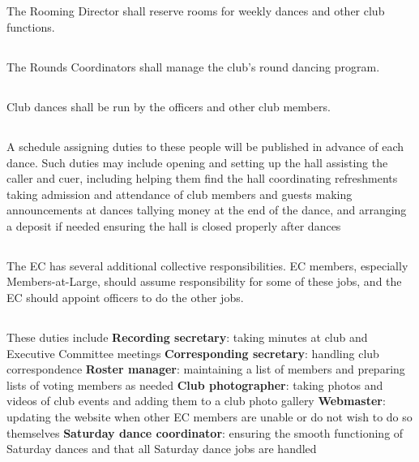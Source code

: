 \documentclass{bylaws}
\begin{document}
\subsection{}The Rooming Director shall reserve rooms for weekly dances and other club functions.
\subsection{}The Rounds Coordinators shall manage the club's round dancing program.

\subsection{}Club dances shall be run by the officers and other club members.

\subsection{}A schedule assigning duties to these people will be published in advance of each dance. Such duties may include
\duty opening and setting up the hall
\duty assisting the caller and cuer, including helping them find the hall
\duty coordinating refreshments
\duty taking admission and attendance of club members and guests
\duty making announcements at dances
\duty tallying money at the end of the dance, and arranging a deposit if needed
\duty ensuring the hall is closed properly after dances

\subsection{}The EC has several additional collective responsibilities. EC members, especially Members-at-Large, should assume responsibility for some of these jobs, and the EC should appoint officers to do the other jobs.
\subsection{}These duties include
\duty \textbf{Recording secretary}: taking minutes at club and Executive Committee meetings
\duty \textbf{Corresponding secretary}: handling club correspondence
\duty \textbf{Roster manager}: maintaining a list of members and preparing lists of voting members as needed
\duty \textbf{Club photographer}: taking photos and videos of club events and adding them to a club photo gallery
\duty \textbf{Webmaster}: updating the website when other EC members are unable or do not wish to do so themselves
\duty \textbf{Saturday dance coordinator}: ensuring the smooth functioning of Saturday dances and that all Saturday dance jobs are handled
\end{document}
